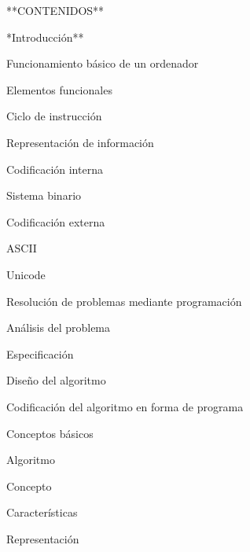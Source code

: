 \item [1] **CONTENIDOS**
\begin{longenum}
    \item **Introducción**
    \begin{longenum}
        \item Funcionamiento básico de un ordenador
        \begin{longenum}
            \item Elementos funcionales
            \item Ciclo de instrucción
            \item Representación de información
            \begin{longenum}
                \item Codificación interna
                \begin{longenum}
                    \item Sistema binario
                \end{longenum}
                \item Codificación externa
                \begin{longenum}
                    \item ASCII
                    \item Unicode
                \end{longenum}
            \end{longenum}
        \end{longenum}
        \item Resolución de problemas mediante programación
        \begin{longenum}
            \item Análisis del problema
            \item Especificación
            \item Diseño del algoritmo
            \item Codificación del algoritmo en forma de programa
        \end{longenum}
        \item Conceptos básicos
        \begin{longenum}
            \item Algoritmo
            \begin{longenum}
                \item Concepto
                \item Características
                \item Representación

\end{longenum}
\end{longenum}
\end{longenum}
\end{longenum}
